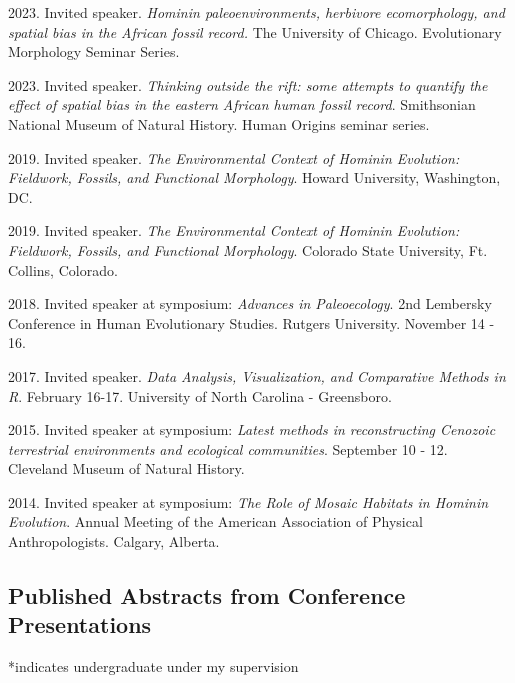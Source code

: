 \documentclass{article}
\newenvironment{mylist}
{\begin{description}[style=unboxed,leftmargin=1.3cm]}
{\end{description}}
\begin{document}
\begin{etaremune}

\item 2023. Invited speaker. \emph{Hominin paleoenvironments, herbivore ecomorphology, and spatial bias in the African fossil record.} The University of Chicago. Evolutionary Morphology Seminar Series. 

\item 2023. Invited speaker.  \emph{Thinking outside the rift: some attempts to quantify the effect of spatial bias in the eastern African human fossil record}. Smithsonian National Museum of Natural History. Human Origins seminar series.  

\item 2019. Invited speaker. \emph{The Environmental Context of Hominin Evolution: Fieldwork, Fossils, and Functional Morphology}. Howard University, Washington, DC.

\item 2019. Invited speaker. \emph{The Environmental Context of Hominin Evolution: Fieldwork, Fossils, and Functional Morphology}. Colorado State University, Ft. Collins, Colorado.


\item 2018. Invited speaker at symposium: \emph{Advances in Paleoecology}. 2nd Lembersky Conference in Human Evolutionary Studies. Rutgers University. November 14 - 16.

\item 2017. Invited speaker. \emph{Data Analysis, Visualization, and Comparative Methods in R}. February 16-17. University of North Carolina - Greensboro.

\item 2015. Invited speaker at symposium: \emph{Latest methods in reconstructing Cenozoic terrestrial environments and ecological communities}. September 10 - 12. Cleveland Museum of Natural History.

\item 2014. Invited speaker at symposium: \emph{The Role of Mosaic Habitats in Hominin Evolution}. Annual Meeting of the American Association of Physical Anthropologists. Calgary, Alberta.
\end{etaremune}


\subsection*{Published Abstracts from Conference Presentations}

\begin{mylist}
\item[] *indicates undergraduate under my supervision
\end{mylist}
\end{document}
